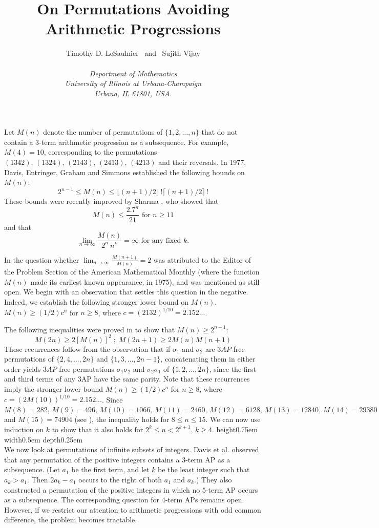 \documentclass[12pt]{article}
\title{On Permutations Avoiding Arithmetic Progressions}
\author{Timothy D. LeSaulnier $\,$ and $\,$ Sujith Vijay \\\\
{\em{\normalsize{Department of Mathematics}}} \\ 
{\em{\normalsize{University of Illinois at Urbana-Champaign}}} \\ 
{\em{\normalsize{Urbana, IL 61801, USA.}}}}
\newcommand{\eop}{\nobreak \ifvmode \relax \else
\ifdim\lastskip<1.5em \hskip-\lastskip
\hskip1.5em plus0em minus0.5em \fi \nobreak
\vrule height0.75em width0.5em depth0.25em\fi}
\begin{document}
\date{}
\maketitle

Let $M(n)$ denote the number of permutations of $\{1,2,\ldots,n\}$ that do 
not contain a $3$-term arithmetic progression as a subsequence. For 
example, $M(4)=10$, corresponding to the permutations $(1342), \,
(1324), \, (2143), \, (2413), \, (4213)$ and their reversals. In 1977, 
Davis, Entringer, Graham and Simmons \cite{Dav77} established the 
following bounds on $M(n)$: $$2^{n-1} \le M(n) \le \lfloor (n+1)/2 \rfloor 
\, ! \lceil (n+1)/2 \rceil \, !$$ These bounds were recently improved by 
Sharma \cite{Sha09}, who showed that $$M(n) \le \frac{2.7^n}{21} \mbox{ 
for } n \ge 11$$ and that $$\lim_{n \to \infty} \frac{M(n)}{2^n \: 
n^k} = \infty \mbox { for any fixed } k.$$

In \cite{Sha09} the question whether $\lim_{n \to \infty}
\frac{M(n+1)}{M(n)} = 2$ was attributed
to the Editor of the Problem Section of the American Mathematical Monthly 
(where the function $M(n)$ made its earliest known appearance, in 1975), 
and was mentioned as still open. We begin with an observation that settles 
this question in the negative. Indeed, we establish the following stronger 
lower bound on $M(n)$. \\

\theorem $M(n) \ge (1/2)c^n$ for $n \ge 8$, where $c=(2132)^{1/10}=2.152...$. 

\proof The following inequalities were proved in \cite{Dav77} to show that 
$M(n) \ge 2^{n-1}$: $$M(2n) \ge 2[M(n)]^2 \; ; \; M(2n+1) \ge 
2M(n)M(n+1)$$ These recurrences follow from the observation that if 
$\sigma_1$ and $\sigma_2$ are $3AP$-free permutations of 
$\{2,4,\ldots,2n\}$ and $\{1,3,\ldots,2n-1\}$, concatenating them in 
either order yields $3AP$-free permutations $\sigma_1 \sigma_2$ and 
$\sigma_2 \sigma_1$ of $\{1,2,\ldots,2n\}$, since the first and third 
terms of any 3AP have the same parity. Note that these recurrences imply 
the stronger lower bound $M(n) \ge (1/2)c^n$ for $n \ge 8$, where 
$c=(2M(10))^{1/10}=2.152...$. Since $M(8)=282, \, M(9)=496, \, M(10)=1066, 
\, M(11)=2460, \, M(12)=6128, \, M(13)=12840, \, M(14)=29380$ and 
$M(15)=74904$ (see \cite{Dav77}), the inequality holds for $8 \le n \le
15$. We can now use induction on $k$ to show that it also holds for 
$2^k \le n < 2^{k+1}, \, k \ge 4$. \eop \\

We now look at permutations of infinite subsets of integers. Davis et al. 
\cite{Dav77} observed that any permutation of the positive integers 
contains a $3$-term AP as a subsequence. (Let $a_1$ be the first term, and 
let $k$ be the least integer such that $a_k > a_1$. Then $2a_k - a_1$ 
occurs to the right of both $a_1$ and $a_k$.) They also constructed a 
permutation of the positive integers in which no $5$-term AP occurs as a 
subsequence. The corresponding question for $4$-term APs remains open. 
However, if we restrict our attention to arithmetic progressions with odd 
common difference, the problem becomes tractable. \\
\end{document}
